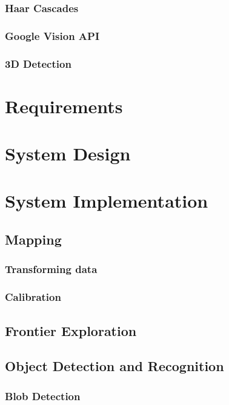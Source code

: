 \documentclass{mproj}
\begin{document}
\subsection{Haar Cascades}
\subsection{Google Vision API}
\subsection{3D Detection}





\chapter{Requirements}


\chapter{System Design}

\chapter{System Implementation}
\section{Mapping}
\subsection{Transforming data}
\subsection{Calibration}
\section{Frontier Exploration}
\section{Object Detection and Recognition}
\subsection{Blob Detection}
\end{document}
